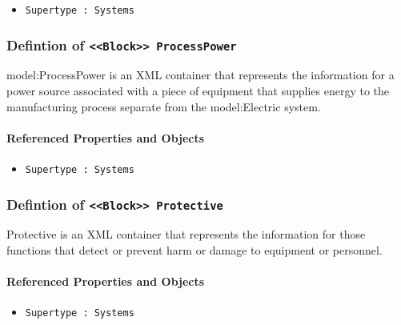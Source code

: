 \begin{itemize}
\item \texttt{Supertype : Systems}

\end{itemize}
\FloatBarrier
\subsubsection{Defintion of \texttt{<<Block>> ProcessPower}}
  \label{type:ProcessPower}

\FloatBarrier

{model:ProcessPower} is an XML container that represents the information for a power source associated with a piece of equipment that supplies energy to the manufacturing process separate from the {model:Electric} system.

\FloatBarrier
\paragraph{Referenced Properties and Objects}

\begin{itemize}
\item \texttt{Supertype : Systems}

\end{itemize}
\FloatBarrier
\subsubsection{Defintion of \texttt{<<Block>> Protective}}
  \label{type:Protective}

\FloatBarrier

Protective is an XML container that represents the information for those functions that detect or prevent harm or damage to equipment or personnel.

\FloatBarrier
\paragraph{Referenced Properties and Objects}

\begin{itemize}
\item \texttt{Supertype : Systems}

\end{itemize}
\FloatBarrier
